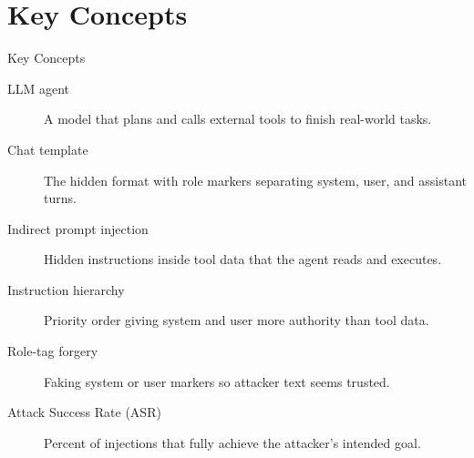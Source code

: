 \documentclass[10pt]{beamer}
\begin{document}
\section{Key Concepts}
\begin{frame}[allowframebreaks]{Key Concepts}
  \begin{description}
    \item[LLM agent] A model that plans and calls external tools to finish real-world tasks.
    \item[Chat template] The hidden format with role markers separating system, user, and assistant turns.
    \item[Indirect prompt injection] Hidden instructions inside tool data that the agent reads and executes.
    \item[Instruction hierarchy] Priority order giving system and user more authority than tool data.
    \item[Role-tag forgery] Faking system or user markers so attacker text seems trusted.
    \item[Attack Success Rate (ASR)] Percent of injections that fully achieve the attacker's intended goal.
  \end{description}
\end{frame}
\end{document}
